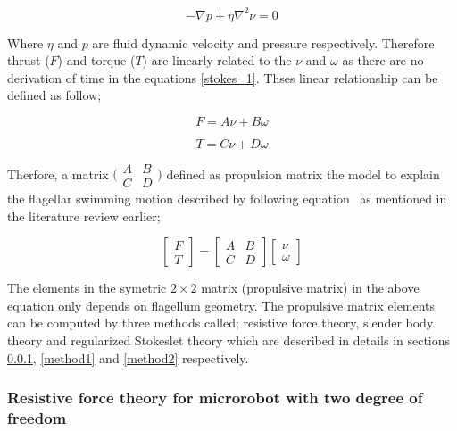 \documentclass[12pt,a4paper,titlepage]{report}
\begin{document}
\begin{equation}
  -\nabla{p}+ \eta\nabla^2{\nu}  = 0
\label{stokes_1}
\end{equation}

Where $\eta$ and $p$ are fluid dynamic velocity and pressure respectively. Therefore thrust ($F$) and 
torque ($T$) are linearly related to the $\nu$ and $\omega$ as there are no derivation of time in 
the equations \ref{stokes_1}. Thses linear relationship can be defined as follow;



\begin{equation}
  F  = A\nu + B\omega
\label{linear1}
\end{equation}

\begin{equation}
  T = C\nu + D\omega
\label{linear2}
\end{equation}


 Therfore, a matrix 
$\bigl(\begin{smallmatrix}
A&B\\ C&D
\end{smallmatrix} \bigr)$
 defined as propulsion matrix the
model to explain the flagellar swimming motion described by following equation~\citep{rodenborn2013propulsion}
as mentioned in the literature review earlier;
 

\[
\begin{bmatrix} F\\ 
T\end{bmatrix}  = \begin{bmatrix} A & B \\ 
C & D \end{bmatrix}  \begin{bmatrix} \nu
 \\ \omega
\end{bmatrix}
\]

The elements in the symetric $2\times2$ matrix (propulsive matrix) in the above equation only depends on 
flagellum geometry. The propulsive matrix elements can be computed by three methods called;
resistive force theory, slender body theory and regularized Stokeslet theory which are described in details in sections \ref{method3}, 
\ref{method1} and \ref{method2} respectively. 


\subsubsection{Resistive force theory for microrobot with two degree of freedom}\label{method3}
\end{document}
